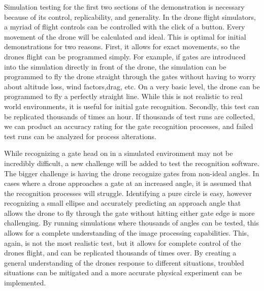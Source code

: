 \documentclass[onecolumn,10pt]{IEEEtran}
\begin{document}
Simulation testing for the first two sections of the demonstration is necessary because of its control, replicability, and generality. In the drone flight simulators, a myriad of flight controls can be controlled with the click of a button. Every movement of the drone will be calculated and ideal. This is optimal for initial demonstrations for two reasons. First, it allows for exact movements, so the drones flight can be programmed simply. For example, if gates are introduced into the simulation directly in front of the drone, the simulation can be programmed to fly the drone straight through the gates without having to worry about altitude loss, wind factors,drag, etc. On a very basic level, the drone can be programmed to fly a perfectly straight line. While this is not realistic to real world environments, it is useful for initial gate recognition. Secondly, this test can be replicated thousands of times an hour. If thousands of test runs are collected, we can product an accuracy rating for the gate recognition processes, and failed test runs can be analyzed for process alterations.

While recognizing a gate head on in a simulated environment may not be incredibly difficult, a new challenge will be added to test the recognition software. The bigger challenge is having the drone recognize gates from non-ideal angles. In cases where a drone approaches a gate at an increased angle, it is assumed that the recognition processes will struggle. Identifying a pure circle is easy, however recognizing a small ellipse and accurately predicting an approach angle that allows the drone to fly through the gate without hitting either gate edge is more challenging. By running simulations where thousands of angles can be tested, this allows for a complete understanding of the image processing capabilities. This, again, is not the most realistic test, but it allows for complete control of the drones flight, and can be replicated thousands of times over. By creating a general understanding of the drones response to different situations, troubled situations can be mitigated and a more accurate physical experiment can be implemented.
\end{document}
